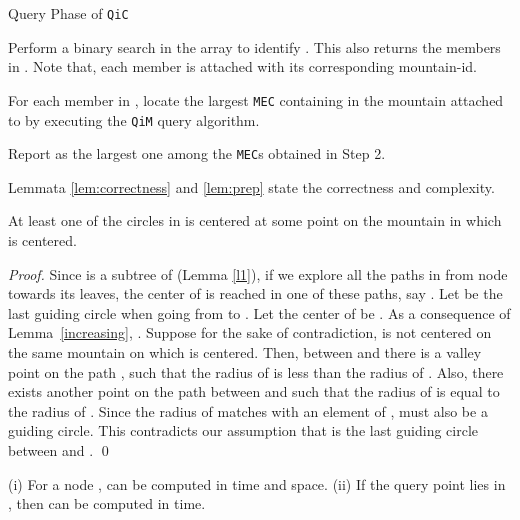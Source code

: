 \documentclass[12pt]{llncs}
\begin{document}
\begin{algorithm}[h!]
\caption{Query Phase of {\tt QiC}}
\label{alg:QiCQuery}
\begin{algorithmic}[1]


\STATE Perform a binary search in the array  to identify 
. This also returns the members in . 
Note that, each member  is attached with its 
corresponding mountain-id.

\STATE For each member in , locate the largest 
{\tt MEC}  containing  in the mountain attached to  by executing the 
{\tt QiM} query algorithm.

\STATE Report  as the largest one among the {\tt MEC}s obtained in
Step 2. 
\end{algorithmic}
\end{algorithm}




Lemmata \ref{lem:correctness} and  \ref{lem:prep} state the correctness and 
complexity. 

\begin{lemma}\label{lem:correctness}
At least one of the circles in  is centered at some point 
on the mountain in which  is centered. 
\end{lemma}

\begin{proof}
Since  is a subtree of  (Lemma \ref{l1}), if we explore all the paths in  
from node  towards its leaves, the center  of  is reached in one 
of these paths, say . Let  be the  last guiding circle when going from  to 
. Let the center of  be . As a consequence of Lemma\ \ref{increasing}, 
. Suppose for the sake of contradiction,  is not centered 
on the same mountain on which  is centered. Then,  between  and  
there is a valley point 
 on the path , such that the radius of  is 
less than the radius of . Also, there exists another point 
 on the path  between  and  such that the radius of 
 is equal to the radius of . Since the radius 
of  matches with an element of ,  
must  also be a guiding circle. This contradicts our assumption that  is the last
guiding circle between  and .  
\qed
\end{proof}

\begin{lemma} \label{lem:prep}
(i) For a node ,  can be computed in  time and 
 space. (ii) If the query point  lies in , then  can be 
computed in  time. 
\end{lemma}
\end{document}
